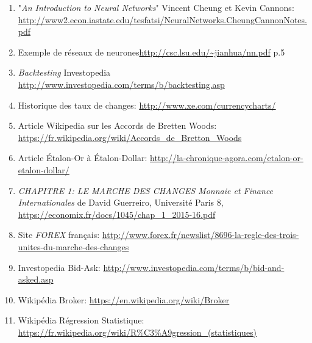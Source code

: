 \documentclass[a4paper, 11pt]{article}
\begin{document}
\begin{enumerate}
\item  "\textit{An Introduction to Neural Networks}" Vincent Cheung et Kevin Cannons: \url{http://www2.econ.iastate.edu/tesfatsi/NeuralNetworks.CheungCannonNotes.pdf}

\item Exemple de réseaux de neurones\url{http://csc.lsu.edu/~jianhua/nn.pdf} p.5

\item \textit{Backtesting} Investopedia \url{http://www.investopedia.com/terms/b/backtesting.asp} \label{backtesting investopedia}

\item Historique des taux de changes: \url{http://www.xe.com/currencycharts/} \label{historique taux de change}

\item Article Wikipedia sur les Accords de Bretten Woods: \url{https://fr.wikipedia.org/wiki/Accords_de_Bretton_Woods} \label{wikipedia bretten woods}

\item Article Étalon-Or à Étalon-Dollar: \url{http://la-chronique-agora.com/etalon-or-etalon-dollar/} \label{étalon-or à étalon-dollar}

\item \textit{CHAPITRE 1: LE MARCHE DES CHANGES Monnaie et Finance Internationales} de David Guerreiro, Université Paris 8, \url{https://economix.fr/docs/1045/chap_1_2015-16.pdf} \label{marche des changes}

\item Site \textit{FOREX} français: \url{http://www.forex.fr/newslist/8696-la-regle-des-trois-unites-du-marche-des-changes} \label{site fr forex}

\item Investopedia Bid-Ask: \url{http://www.investopedia.com/terms/b/bid-and-asked.asp} \label{investopedia bid ask}

\item Wikipédia Broker: \url{https://en.wikipedia.org/wiki/Broker} \label{wikipedia broker}

\item Wikipédia Régression Statistique: \url{https://fr.wikipedia.org/wiki/R\%C3\%A9gression_(statistiques)} \label{wikipedia régression}
\end{enumerate}
\end{document}
